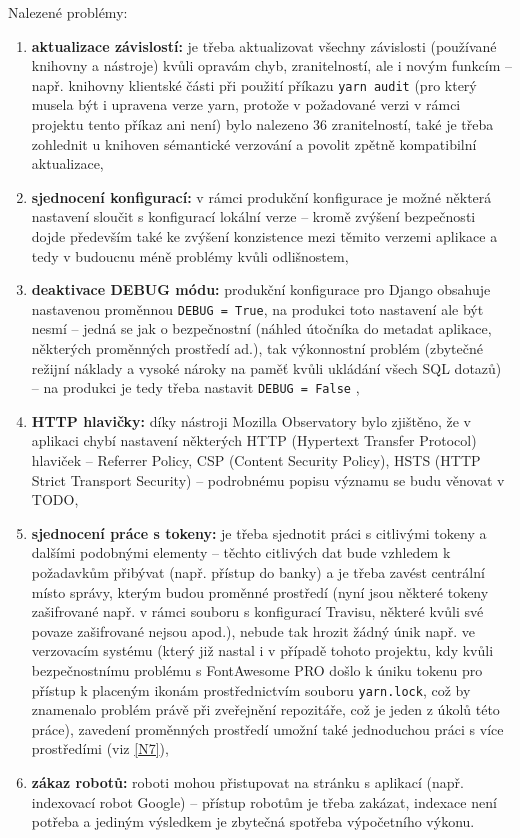 Nalezené problémy:
\begin{enumerate}[label=\textbf{B\arabic*}]
    \item \label{B1} \textbf{aktualizace závislostí:} je třeba aktualizovat všechny závislosti (používané knihovny a nástroje) kvůli opravám chyb, zranitelností, ale i novým funkcím -- např. knihovny klientské části při použití příkazu \verb|yarn audit| (pro který musela být i upravena verze yarn, protože v požadované verzi v rámci projektu tento příkaz ani není) bylo nalezeno 36 zranitelností, také je třeba zohlednit u knihoven sémantické verzování a povolit zpětně kompatibilní aktualizace,
    \item \label{B2} \textbf{sjednocení konfigurací:} v rámci produkční konfigurace je možné některá nastavení sloučit s konfigurací lokální verze -- kromě zvýšení bezpečnosti dojde především také ke zvýšení konzistence mezi těmito verzemi aplikace a tedy v budoucnu méně problémy kvůli odlišnostem,
    \item \label{B3} \textbf{deaktivace DEBUG módu:} produkční konfigurace pro 
    Django obsahuje nastavenou proměnnou \verb|DEBUG = True|, na produkci toto nastavení ale být nesmí -- jedná se jak o bezpečnostní (náhled útočníka do metadat aplikace, některých proměnných prostředí ad.), tak výkonnostní problém (zbytečné režijní náklady a vysoké nároky na paměť kvůli ukládání všech SQL dotazů) -- na produkci je tedy třeba nastavit \verb|DEBUG = False| \cite{django-debug},
    \item \label{B4} \textbf{HTTP hlavičky:} díky nástroji Mozilla Observatory bylo zjištěno, že v aplikaci chybí nastavení některých HTTP (Hypertext Transfer Protocol) hlaviček -- Referrer Policy, CSP (Content Security Policy), HSTS (HTTP Strict Transport Security) -- podrobnému popisu významu se budu věnovat v TODO,
    \item \label{B5} \textbf{sjednocení práce s tokeny:} je třeba sjednotit práci s citlivými tokeny a dalšími podobnými elementy -- těchto citlivých dat bude vzhledem k požadavkům přibývat (např. přístup do banky) a je třeba zavést centrální místo správy, kterým budou proměnné prostředí (nyní jsou některé tokeny zašifrované např. v rámci souboru s konfigurací Travisu, některé kvůli své povaze zašifrované nejsou apod.), nebude tak hrozit žádný únik např. ve verzovacím systému (který již nastal i v případě tohoto projektu, kdy kvůli bezpečnostnímu problému s FontAwesome PRO \cite{fontawesome-token} došlo k úniku tokenu pro přístup k placeným ikonám prostřednictvím souboru \verb|yarn.lock|, což by znamenalo problém právě při zveřejnění repozitáře, což je jeden z úkolů této práce), zavedení proměnných prostředí umožní také jednoduchou práci s více prostředími (viz \ref{N7}),
    \item \label{B6} \textbf{zákaz robotů:} roboti mohou přistupovat na stránku s aplikací (např. indexovací robot Google) -- přístup robotům je třeba zakázat, indexace není potřeba a jediným výsledkem je zbytečná spotřeba výpočetního výkonu.
\end{enumerate}



